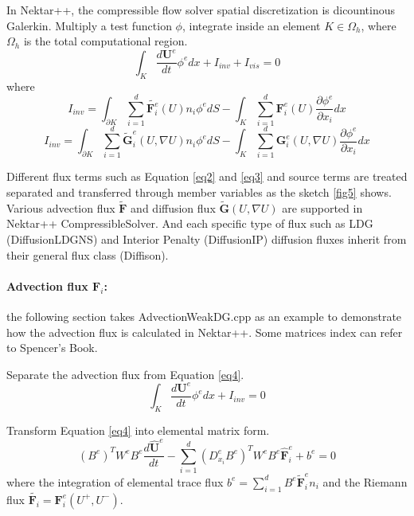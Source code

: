 In Nektar++, the compressible flow solver spatial discretization is dicountinous Galerkin. Multiply a test function $\phi$, integrate inside an element $K\in \Omega_{h}$, where $\Omega_{h}$ is the total computational region.
\begin{equation}\label{eq4}
\int_{K}{\frac{d \textbf{U}^{e}}{d t}\phi^{e} dx}+I_{inv}+I_{vis}=0
\end{equation}
where
\begin{equation}\label{eq2}
I_{inv}={\int_{\partial K}{\sum\limits_{i=1}^{d}{\widetilde{\textbf{F}^{e}_{i}}(U)n_{i}\phi^{e}}}dS}-
{\int_{K}{\sum\limits_{i=1}^{d}{\textbf{F}^{e}_{i}(U)\frac{\partial \phi^{e}}{\partial x_{i}}dx}}}
\end{equation}
\begin{equation}\label{eq3}
I_{inv}= {\int_{\partial K}{\sum\limits_{i=1}^{d}{\widetilde{\textbf{G}}^{e}_{i}(U,\nabla U)n_{i}\phi^{e}}}dS}-
{\int_{K}{\sum\limits_{i=1}^{d}{\textbf{G}^{e}_{i}(U,\nabla U)\frac{\partial \phi^{e}}{\partial x_{i}}dx}}}
\end{equation}

Different flux terms such as Equation \eqref{eq2} and \eqref{eq3} and source terms are treated separated and transferred through member variables as the sketch \ref{fig5} shows.
Various advection flux $\widetilde{\textbf{F}}$ and diffusion flux $\widetilde{\textbf{G}}(U,\nabla U)$ are supported in Nektar++ CompressibleSolver. And each specific type of flux such as LDG (DiffusionLDGNS) and Interior Penalty (DiffusionIP) diffusion fluxes inherit from their general flux class (Diffison).

\paragraph{Advection flux $\textbf{F}_{i}$: }
the following section takes AdvectionWeakDG.cpp as an example to demonstrate how the advection flux is calculated in Nektar++. Some matrices index can refer to Spencer's Book.

Separate the advection flux from Equation \eqref{eq4}.
\begin{equation}
\int_{K}{\frac{d \textbf{U}^{e}}{d t}\phi^{e} dx}+I_{inv}=0
\end{equation}

Transform Equation \eqref{eq4} into elemental matrix form.
\begin{equation}\label{eq5}
(B^{e})^{T}W^{e}B^{e}\frac{d \hat{\textbf{U}}^{e}}{d t}
-\sum\limits_{i=1}^{d}{(D^{e}_{x_{i}} B^{e})^{T}}W^{e}B^{e}\hat{\textbf{F}}^{e}_{i}+
b^{e}
=0
\end{equation}
where the integration of elemental trace flux $b^{e}=\sum\limits_{i=1}^{d}{B^{e}\widetilde{\textbf{F}}^{e}_{i}}n_{i}$ and the Riemann flux $\widetilde{\textbf{F}_{i}}=\textbf{F}^{e}_{i}(U^{+},U^{-})$.

